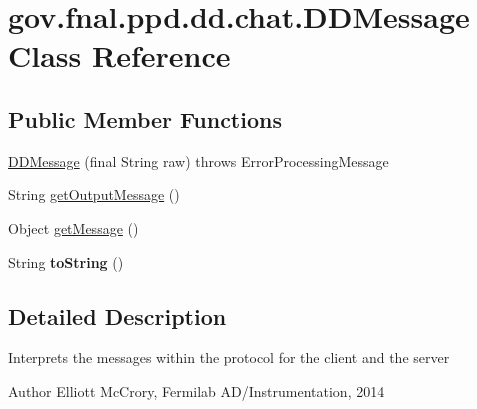 \hypertarget{classgov_1_1fnal_1_1ppd_1_1dd_1_1chat_1_1DDMessage}{\section{gov.\-fnal.\-ppd.\-dd.\-chat.\-D\-D\-Message Class Reference}
\label{classgov_1_1fnal_1_1ppd_1_1dd_1_1chat_1_1DDMessage}
}
\subsection*{Public Member Functions}
\begin{DoxyCompactItemize}
\item 
\hyperlink{classgov_1_1fnal_1_1ppd_1_1dd_1_1chat_1_1DDMessage_a4e12b6c5ebadc164c409b32516612c61}{D\-D\-Message} (final String raw)  throws Error\-Processing\-Message 
\item 
String \hyperlink{classgov_1_1fnal_1_1ppd_1_1dd_1_1chat_1_1DDMessage_a01b517b9e7b2acc2524cbd92c76d7fa6}{get\-Output\-Message} ()
\item 
Object \hyperlink{classgov_1_1fnal_1_1ppd_1_1dd_1_1chat_1_1DDMessage_ae33fd36c9f1fe620862f668cf58d11cc}{get\-Message} ()
\item 
\hypertarget{classgov_1_1fnal_1_1ppd_1_1dd_1_1chat_1_1DDMessage_a632b738d2bc786effaa8b5b58aff590f}{String {\bfseries to\-String} ()}\label{classgov_1_1fnal_1_1ppd_1_1dd_1_1chat_1_1DDMessage_a632b738d2bc786effaa8b5b58aff590f}

\end{DoxyCompactItemize}


\subsection{Detailed Description}
Interprets the messages within the protocol for the client and the server

\begin{DoxyAuthor}{Author}
Elliott Mc\-Crory, Fermilab A\-D/\-Instrumentation, 2014 
\end{DoxyAuthor}


